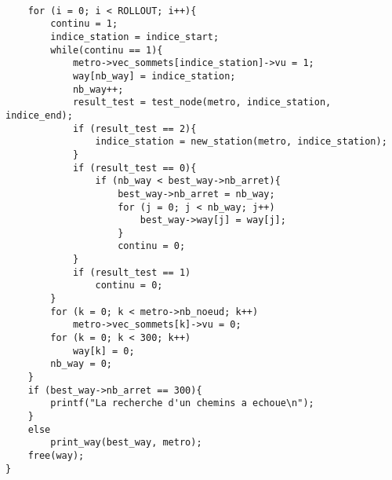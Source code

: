\documentclass[12pt, twoside]{report}
\begin{document}
\begin{verbatim}
	
	for (i = 0; i < ROLLOUT; i++){
		continu = 1;
		indice_station = indice_start;
		while(continu == 1){
			metro->vec_sommets[indice_station]->vu = 1;
			way[nb_way] = indice_station;
			nb_way++;
			result_test = test_node(metro, indice_station, indice_end);
			if (result_test == 2){
				indice_station = new_station(metro, indice_station);
			}
			if (result_test == 0){
				if (nb_way < best_way->nb_arret){
					best_way->nb_arret = nb_way;
					for (j = 0; j < nb_way; j++)
						best_way->way[j] = way[j];
					}
					continu = 0;
			}
			if (result_test == 1)
				continu = 0;
		}
		for (k = 0; k < metro->nb_noeud; k++)
			metro->vec_sommets[k]->vu = 0;
		for (k = 0; k < 300; k++)
			way[k] = 0;
		nb_way = 0;
	}
	if (best_way->nb_arret == 300){
		printf("La recherche d'un chemins a echoue\n");
	}
	else
		print_way(best_way, metro);
	free(way);
}
\end{verbatim}
\end{document}
